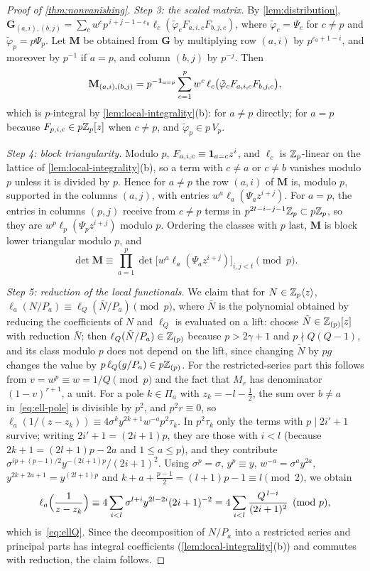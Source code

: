 \begin{proof}[Proof of \cref{thm:nonvanishing}]
\emph{Step 3: the scaled matrix.} By \cref{lem:distribution},
$\mathbf G_{(a,i),(b,j)}=\sum_cw^cp^{\,i+j-1-e_0}\ell_c(\tilde\varphi_cF_{a,i,c}F_{b,j,c})$, where
$\tilde\varphi_c=\Psi_c$ for $c\ne p$ and $\tilde\varphi_p=p\Psi_p$. Let $\mathbf M$ be obtained from
$\mathbf G$ by multiplying row $(a,i)$ by $p^{e_0+1-i}$, and moreover by $p^{-1}$ if $a=p$, and
column $(b,j)$ by $p^{-j}$. Then
\[
  \mathbf M_{(a,i),(b,j)}=p^{-\mathbf{1}_{a=p}}\sum_{c=1}^pw^c\,\ell_c\bigl(\tilde\varphi_cF_{a,i,c}F_{b,j,c}\bigr),
\]
which is $p$-integral by \cref{lem:local-integrality}(b): for $a\ne p$ directly; for $a=p$ because
$F_{p,i,c}\in p\mathbb{Z}_p[z]$ when $c\ne p$, and $\tilde\varphi_p\in p\,V_p$.

\emph{Step 4: block triangularity.} Modulo $p$, $F_{a,i,c}\equiv\mathbf{1}_{a=c}z^i$, and $\ell_c$ is
$\mathbb{Z}_p$-linear on the lattice of \cref{lem:local-integrality}(b), so a term with $c\ne a$ or $c\ne b$
vanishes modulo $p$ unless it is divided by $p$. Hence for $a\ne p$ the row $(a,i)$ of
$\mathbf M$ is, modulo $p$, supported in the columns $(a,j)$, with entries
$w^a\ell_a(\Psi_az^{i+j})$. For $a=p$, the entries in columns $(p,j)$ receive from $c\ne p$ terms
in $p^{2t-i-j-1}\mathbb{Z}_p\subset p\mathbb{Z}_p$, so they are $w^p\ell_p(\Psi_pz^{i+j})$ modulo $p$. Ordering the
classes with $p$ last, $\mathbf M$ is block lower triangular modulo $p$, and
\begin{equation}\label{eq:det-product}
  \det\mathbf M\equiv\prod_{a=1}^{p}\det\bigl[w^a\ell_a(\Psi_az^{i+j})\bigr]_{i,j<t}\pmod p .
\end{equation}

\emph{Step 5: reduction of the local functionals.} We claim that for $N\in\mathbb{Z}_p\langle z\rangle$,
$\ell_a(N/P_a)\equiv\ell_Q(\bar N/P_a)\pmod p$, where $\bar N$ is the polynomial obtained by
reducing the coefficients of $N$ and $\ell_Q$ is evaluated on a lift: choose
$\tilde N\in\mathbb{Z}_{(p)}[z]$ with reduction $\bar N$; then $\ell_Q(\tilde N/P_a)\in\mathbb{Z}_{(p)}$ because
$p>2\gamma+1$ and $p\nmid Q(Q-1)$, and its class modulo $p$ does not depend on the lift, since
changing $\tilde N$ by $pg$ changes the value by $p\,\ell_Q(g/P_a)\in p\mathbb{Z}_{(p)}$. For the restricted-series
part this follows from $v=w^p\equiv w=1/Q\pmod p$ and the fact that $M_r$ has denominator
$(1-v)^{r+1}$, a unit. For a pole $k\in\Pi_a$ with $z_k=-l-\frac12$, the sum over $b\ne a$
in~\eqref{eq:ell-pole} is divisible by $p^2$, and $p^2r\equiv0$, so
$\ell_a(1/(z-z_k))\equiv4\sigma^ky^{2k+1}w^{-a}p^2\tau_k$. In $p^2\tau_k$ only the terms with
$p\mid2i'+1$ survive; writing $2i'+1=(2i+1)p$, they are those with $i<l$ (because
$2k+1=(2l+1)p-2a$ and $1\le a\le p$), and they contribute
$\sigma^{ip+(p-1)/2}y^{-(2i+1)p}/(2i+1)^2$. Using $\sigma^p=\sigma$, $y^p\equiv y$, $w^{-a}=\sigma^a
y^{2a}$, $y^{2k+2a+1}=y^{(2l+1)p}$ and $k+a+\frac{p-1}2=(l+1)p-1\equiv l\pmod2$, we obtain
\[
  \ell_a\Bigl(\frac{1}{z-z_k}\Bigr)\equiv4\sum_{i<l}\sigma^{l+i}y^{2l-2i}(2i+1)^{-2}
  =4\sum_{i<l}\frac{Q^{\,l-i}}{(2i+1)^2}\pmod p,
\]
which is~\eqref{eq:ellQ}. Since the decomposition of $N/P_a$ into a restricted series and
principal parts has integral coefficients (\cref{lem:local-integrality}(b)) and commutes with
reduction, the claim follows.


\end{proof}

